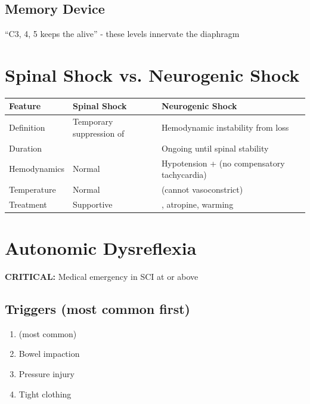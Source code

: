 \documentclass[11pt]{article}
\begin{document}
\subsection{Memory Device}
``C3, 4, 5 keeps the \underline{\hspace{3cm}} alive'' - these levels innervate the diaphragm

\hrulefill

\section{Spinal Shock vs. Neurogenic Shock}

\begin{center}
\begin{tabular}{|p{3cm}|p{4cm}|p{4cm}|}
\hline
\textbf{Feature} & \textbf{Spinal Shock} & \textbf{Neurogenic Shock} \\
\hline
Definition & Temporary suppression of \underline{\hspace{2cm}} & Hemodynamic instability from \underline{\hspace{2cm}} loss \\
\hline
Duration & \underline{\hspace{2cm}} & Ongoing until spinal stability \\
\hline
Hemodynamics & Normal & Hypotension + \underline{\hspace{2cm}} (no compensatory tachycardia) \\
\hline
Temperature & Normal & \underline{\hspace{2cm}} (cannot vasoconstrict) \\
\hline
Treatment & Supportive & \underline{\hspace{2cm}}, atropine, warming \\
\hline
\end{tabular}
\end{center}

\hrulefill

\section{Autonomic Dysreflexia}

\textbf{CRITICAL:} Medical emergency in SCI at or above \underline{\hspace{2cm}}

\subsection{Triggers (most common first)}
\begin{enumerate}
    \item \underline{\hspace{3cm}} (most common)
    \item Bowel impaction
    \item Pressure injury
    \item Tight clothing
\end{enumerate}
\end{document}
